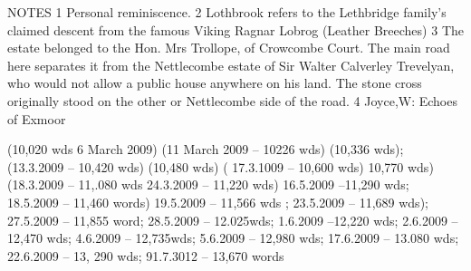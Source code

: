 \documentclass[11pt]{book}
\begin{document}
				







NOTES
1 Personal reminiscence.
2 Lothbrook refers to the Lethbridge family’s claimed descent from the famous Viking Ragnar Lobrog (Leather Breeches)
3 The estate belonged to the Hon. Mrs Trollope, of Crowcombe Court. The main road here separates it from  the Nettlecombe estate of Sir Walter Calverley Trevelyan,  who would not allow a public house anywhere on his land.  The stone cross originally stood on the other or Nettlecombe side of the road. 
4 Joyce,W: Echoes of Exmoor

(10,020 wds 6 March 2009)   (11 March 2009 – 10226 wds)  (10,336 wds);
 (13.3.2009 – 10,420 wds)       (10,480 wds)  (     17.3.1009 – 10,600 wds) 
 10,770 wds)   (18.3.2009 – 11,.080 wds 24.3.2009 – 11,220 wds)   16.5.2009 –11,290 wds; 18.5.2009 – 11,460 words)   19.5.2009 – 11,566 wds ; 23.5.2009 – 11,689 wds); 27.5.2009 – 11,855 word;  	28.5.2009 – 12.025wds;  1.6.2009 –12,220 wds;  2.6.2009 – 12,470 wds;  4.6.2009 – 12,735wds;  5.6.2009 – 12,980 wds; 17.6.2009 – 13.080 wds;  22.6.2009 – 13, 290 wds; 91.7.3012 – 13,670 words
 

				 
 
 
\end{document}
